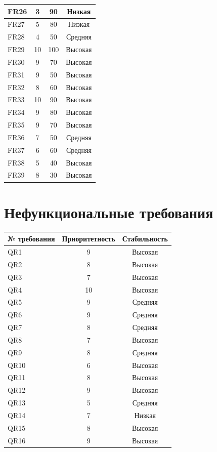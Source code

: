 \documentclass{scrreprt}
\begin{document}
\begin{table}[h]
\begin{tabular}{|l|c|c|c|}
		FR26 & 3 & 90 & Низкая \\ \hline
		FR27 & 5 & 80 & Низкая \\ \hline
		FR28 & 4 & 50 & Средняя \\ \hline
		FR29 & 10 & 100 & Высокая \\ \hline
		FR30 & 9 & 70 & Высокая \\ \hline
		FR31 & 9 & 50 & Высокая \\ \hline
		FR32 & 8 & 60 & Высокая \\ \hline
		FR33 & 10 & 90 & Высокая \\ \hline
		FR34 & 9 & 80 & Высокая \\ \hline
		FR35 & 9 & 70 & Высокая \\ \hline
		FR36 & 7 & 50 & Средняя \\ \hline
		FR37 & 6 & 60 & Средняя \\ \hline
		FR38 & 5 & 40 & Высокая \\ \hline
		FR39 & 8 & 30 & Высокая \\ \hline
		
	\end{tabular}
	\label{tab:requirements}
\end{table}
\section{Нефункциональные требования}
\begin{table}[h]
	\centering
	\begin{tabular}{|l|c|c|}
		\hline
		№ требования & Приоритетность & Стабильность \\ \hline
		QR1 & 9 & Высокая \\ \hline
		QR2 & 8 & Высокая \\ \hline
		QR3 & 7 & Высокая \\ \hline
		QR4 & 10 & Высокая \\ \hline
		QR5 & 9 & Средняя \\ \hline
		QR6 & 9 & Средняя \\ \hline
		QR7 & 8 & Средняя \\ \hline
		QR8 & 7 & Высокая \\ \hline
		QR9 & 8 & Средняя \\ \hline
		QR10 & 6 & Высокая \\ \hline
		QR11 & 8 & Высокая \\ \hline
		QR12 & 9 & Высокая \\ \hline
		QR13 & 5 & Средняя \\ \hline
		QR14 & 7 & Низкая \\ \hline
		QR15 & 8 & Высокая \\ \hline
		QR16 & 9 & Высокая \\ \hline
		
	\end{tabular}
	\label{tab:requirements}
\end{table}
\end{document}
